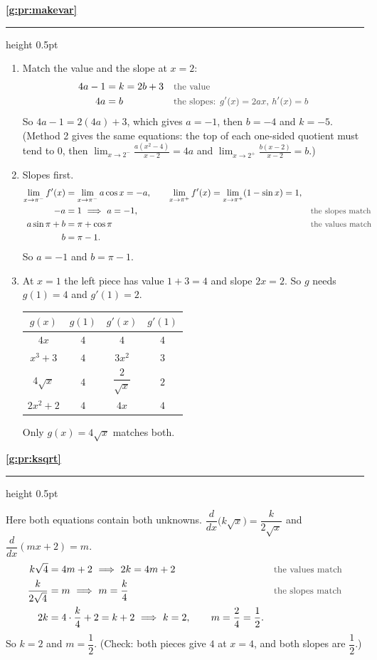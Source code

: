 \documentclass[11pt,a4paper]{article}
\newcommand{\solitem}[2]{%
 \par\addvspace{16pt}\Needspace{10\baselineskip}%
 {\large\bfseries \ref{#1}}\par\nobreak\vspace{2pt}%
 {\color{rulegray}\hrule height 0.5pt}\nobreak\vspace{7pt}%
 #2\par}
\newcommand{\why}[1]{\text{\small\color{darkgray}#1}}
\newcommand{\imp}{\ \Longrightarrow\ }
\begin{document}
\solitem{g:pr:makevar}{%
\begin{enumerate}[label=(\alph*)]
 \item Match the value and the slope at $x=2$:
 \begin{align*}
 4a-1&=k=2b+3 &&\why{the value}\\
 4a&=b &&\why{the slopes: $g'(x)=2ax$, $h'(x)=b$}
 \end{align*}
 So $4a-1=2(4a)+3$, which gives $a=-1$, then $b=-4$ and $k=-5$. (Method 2 gives the same equations: the top of each one-sided quotient must tend to $0$, then $\displaystyle\lim_{x\to2^-}\frac{a(x^2-4)}{x-2}=4a$ and $\displaystyle\lim_{x\to2^+}\frac{b(x-2)}{x-2}=b$.)
 \item Slopes first.
 \begin{align*}
 \lim_{x\to\pi^-}f'(x)&=\lim_{x\to\pi^-}a\cos x=-a,\qquad \lim_{x\to\pi^+}f'(x)=\lim_{x\to\pi^+}(1-\sin x)=1,\\
 -a&=1\imp a=-1, &&\why{the slopes match}\\
 a\sin\pi+b&=\pi+\cos\pi &&\why{the values match}\\
 b&=\pi-1.
 \end{align*}
 So $a=-1$ and $b=\pi-1$.
 \item At $x=1$ the left piece has value $1+3=4$ and slope $2x=2$. So $g$ needs $g(1)=4$ and $g'(1)=2$.
 \begin{center}
 \renewcommand{\arraystretch}{1.9}
 \begin{tabular}{|c|c|c|c|}\hline
 $g(x)$ & $g(1)$ & $g'(x)$ & $g'(1)$\\ \hline
 $4x$ & $4$ & $4$ & $4$\\ \hline
 $x^3+3$ & $4$ & $3x^2$ & $3$\\ \hline
 $4\sqrt x$ & $4$ & $\dfrac{2}{\sqrt x}$ & $2$\\ \hline
 $2x^2+2$ & $4$ & $4x$ & $4$\\ \hline
 \end{tabular}
 \end{center}
 Only $g(x)=4\sqrt x$ matches both.
\end{enumerate}
}

\solitem{g:pr:ksqrt}{%
Here both equations contain both unknowns. $\dfrac{d}{dx}\bigl(k\sqrt x\bigr)=\dfrac{k}{2\sqrt x}$ and $\dfrac{d}{dx}(mx+2)=m$.
\begin{align*}
k\sqrt4&=4m+2\imp 2k=4m+2 &&\why{the values match}\\
\frac{k}{2\sqrt4}&=m\imp m=\frac k4 &&\why{the slopes match}\\
2k&=4\cdot\frac k4+2=k+2\imp k=2,\qquad m=\frac24=\frac12.
\end{align*}
So $k=2$ and $m=\dfrac12$. (Check: both pieces give $4$ at $x=4$, and both slopes are $\dfrac12$.)
}
\end{document}
